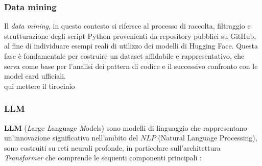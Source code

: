 \documentclass{article}
\begin{document}
\subsubsection{Data mining}
Il \textit{data mining}, in questo contesto si rifersce al processo di raccolta, filtraggio e strutturazione degli script Python provenienti da repository pubblici su GitHub, al fine di individuare esempi reali di utilizzo dei modelli di Hugging Face. Questa fase è fondamentale per costruire un dataset affidabile e rappresentativo, che serva come base per l'analisi dei pattern di codice e il successivo confronto con le model card ufficiali.
\\ qui mettere il tirocinio

\subsubsection{LLM} 
\textbf{LLM} (\textit{L}arge \textit{L}anguage \textit{M}odels) sono modelli di linguaggio che rappresentano un'innovazione significativa nell'ambito del \(NLP\) (Natural Language Processing), sono costruiti su reti neurali profonde, in particolare sull'architettura \textit{Transformer} che comprende le sequenti componenti principali \cite{di2025use}:
\end{document}
